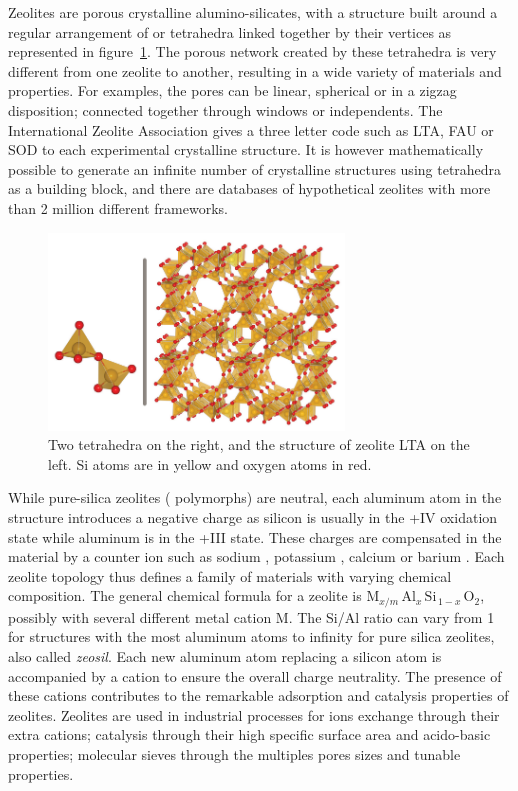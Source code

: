 \documentclass[thesis]{subfiles}
\begin{document}
Zeolites are porous crystalline alumino-silicates, with a structure built around
a regular arrangement of  or  tetrahedra linked together by
their vertices as represented in figure~\ref{fig:zeolite-building-block}. The
porous network created by these tetrahedra is very different from one zeolite to
another, resulting in a wide variety of materials and properties. For examples,
the pores can be linear, spherical or in a zigzag disposition; connected
together through windows or independents. The International Zeolite
Association\cite{iza-website} gives a three letter code such as LTA, FAU or SOD
to each experimental crystalline structure. It is however mathematically
possible to generate an infinite number of crystalline structures using
tetrahedra as a building block, and there are databases of hypothetical zeolites
with more than 2 million different frameworks\cite{hypothetical-zeolites}.

\begin{figure}[ht]
    \centering
    \includegraphics[width=0.7\textwidth]{figures/cited/zeolite-building-blocks}
    \caption{Two  tetrahedra on the right, and the structure of zeolite
    LTA on the left. Si atoms are in yellow and oxygen atoms in red.}
    \label{fig:zeolite-building-block}
\end{figure}

While pure-silica zeolites ( polymorphs) are neutral, each aluminum
atom in the structure introduces a negative charge as silicon is usually in the
+IV oxidation state while aluminum is in the +III state. These charges are
compensated in the material by a counter ion such as sodium , potassium
, calcium  or barium . Each zeolite topology thus
defines a family of materials with varying chemical composition. The general
chemical formula for a zeolite is $\text{M}_{x/m}\, \text{Al}_x\,
\text{Si}_{\,1-x}\, \text{O}_2$, possibly with several different metal cation M.
The Si/Al ratio can vary from 1 for structures with the most aluminum atoms to
infinity for pure silica zeolites, also called \emph{zeosil}. Each new aluminum
atom replacing a silicon atom is accompanied by a cation to ensure the overall
charge neutrality. The presence of these cations contributes to the remarkable
adsorption and catalysis properties of zeolites. Zeolites are used in industrial
processes for ions exchange through their extra cations; catalysis through their
high specific surface area and acido-basic properties; molecular sieves through
the multiples pores sizes and tunable properties.
\end{document}
